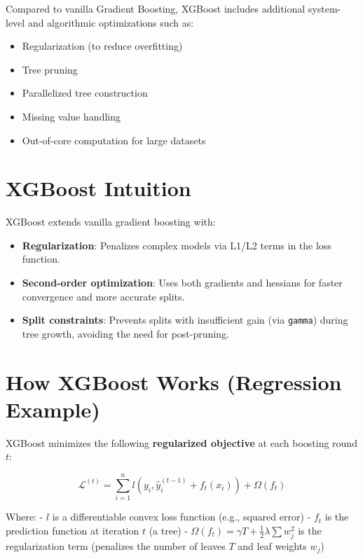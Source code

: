 \documentclass[
  letterpaper,
  DIV=11,
  numbers=noendperiod]{scrreprt}
\providecommand{\tightlist}{%
  \setlength{\itemsep}{0pt}\setlength{\parskip}{0pt}}\usepackage{longtable,booktabs,array}
\begin{document}
Compared to vanilla Gradient Boosting, XGBoost includes additional
system-level and algorithmic optimizations such as:

\begin{itemize}
\tightlist
\item
  Regularization (to reduce overfitting)
\item
  Tree pruning
\item
  Parallelized tree construction
\item
  Missing value handling
\item
  Out-of-core computation for large datasets
\end{itemize}

\section{XGBoost Intuition}\label{xgboost-intuition}

XGBoost extends vanilla gradient boosting with:

\begin{itemize}
\tightlist
\item
  \textbf{Regularization}: Penalizes complex models via L1/L2 terms in
  the loss function.
\item
  \textbf{Second-order optimization}: Uses both gradients and hessians
  for faster convergence and more accurate splits.
\item
  \textbf{Split constraints}: Prevents splits with insufficient gain
  (via \texttt{gamma}) during tree growth, avoiding the need for
  post-pruning.
\end{itemize}

\section{How XGBoost Works (Regression
Example)}\label{how-xgboost-works-regression-example}

XGBoost minimizes the following \textbf{regularized objective} at each
boosting round \(t\):

\[
\mathcal{L}^{(t)} = \sum_{i=1}^n l(y_i, \hat{y}_i^{(t-1)} + f_t(x_i)) + \Omega(f_t)
\]

Where: - \(l\) is a differentiable convex loss function (e.g., squared
error) - \(f_t\) is the prediction function at iteration \(t\) (a tree)
- \(\Omega(f_t) = \gamma T + \frac{1}{2} \lambda \sum w_j^2\) is the
regularization term (penalizes the number of leaves \(T\) and leaf
weights \(w_j\))
\end{document}
